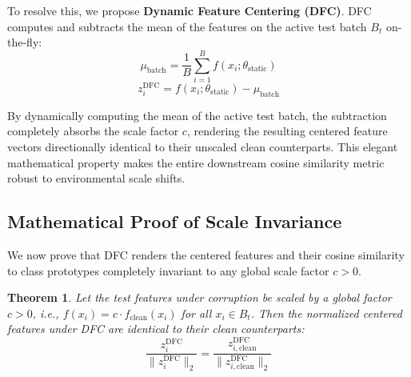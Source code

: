 \documentclass{article}
\theoremstyle{plain}
\newtheorem{theorem}{Theorem}[section]
\theoremstyle{definition}
\theoremstyle{remark}
\begin{document}
To resolve this, we propose \textbf{Dynamic Feature Centering (DFC)}. DFC computes and subtracts the mean of the features on the active test batch $B_t$ on-the-fly:
\begin{equation}
  \mu_{\text{batch}} = \frac{1}{B} \sum_{i=1}^B f(x_i; \theta_{\text{static}})
\end{equation}
\begin{equation}
  z_i^{\text{DFC}} = f(x_i; \theta_{\text{static}}) - \mu_{\text{batch}}
\end{equation}

By dynamically computing the mean of the active test batch, the subtraction completely absorbs the scale factor $c$, rendering the resulting centered feature vectors directionally identical to their unscaled clean counterparts. This elegant mathematical property makes the entire downstream cosine similarity metric robust to environmental scale shifts.

\subsection{Mathematical Proof of Scale Invariance}
We now prove that DFC renders the centered features and their cosine similarity to class prototypes completely invariant to any global scale factor $c > 0$.

\begin{theorem}
Let the test features under corruption be scaled by a global factor $c > 0$, i.e., $f(x_i) = c \cdot f_{\text{clean}}(x_i)$ for all $x_i \in B_t$. Then the normalized centered features under DFC are identical to their clean counterparts:
\begin{equation}
  \frac{z_i^{\text{DFC}}}{\|z_i^{\text{DFC}}\|_2} = \frac{z_{i,\text{clean}}^{\text{DFC}}}{\|z_{i,\text{clean}}^{\text{DFC}}\|_2}
\end{equation}
\end{theorem}
\end{document}
